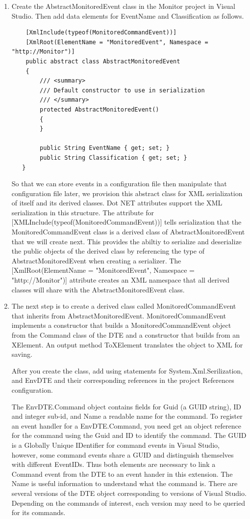 \begin{enumerate}
\item
Create the AbstractMonitoredEvent class in the Monitor project in Visual Studio.  Then add data elements for EventName and Classification as follows.

\begin{lstlisting}
    [XmlInclude(typeof(MonitoredCommandEvent))]
    [XmlRoot(ElementName = "MonitoredEvent", Namespace = "http://Monitor")]
    public abstract class AbstractMonitoredEvent
    {
        /// <summary>
        /// Default constructor to use in serialization
        /// </summary>
        protected AbstractMonitoredEvent()
        {
        }

        public String EventName { get; set; }
        public String Classification { get; set; }
   }
\end{lstlisting}

So that we can store events in a configuration file then manipulate that configuration file later, we provision this abstract class for XML serialization of itself and its derived classes.  Dot NET attributes support the XML serialization in this structure.  The attribute for [XMLInclude(typeof(MonitoredCommandEvent))] tells serialization that the MonitoredCommandEvent class is a derived class of AbstractMonitoredEvent that we will create next.  This provides the abiltiy to serialize and deserialize the public objects of the derived class by referencing the type of AbstractMonitoredEvent when creating a serializer.  The [XmlRoot(ElementName = "MonitoredEvent", Namespace = "http://Monitor")] attribute creates an XML namespace that all derived classes will share with the AbstractMonitoredEvent class.

\item
The next step is to create a derived class called MonitoredCommandEvent that inherits from AbstractMonitoredEvent.  MonitoredCommandEvent implements a constructor that builds a MonitoredCommandEvent object from the Command class of the DTE and a constructor that builds from an XElement.  An output method ToXElement translates the object to XML for saving.

After you create the class, add using statements for System.Xml.Serilization, and EnvDTE and their corresponding references in the project References configuration. 

The EnvDTE.Command object contains fields for Guid (a GUID string), ID and integer sub-id, and Name a readable name for the command.  To register an event handler for a EnvDTE.Command, you need get an object reference for the command using the Guid and ID to identify the command.  The GUID is  a Globally Unique IDentifier for command events in Visual Studio, however, some command events share a GUID and distinguish themselves with different EventIDs. Thus both elements are necessary to link a Command event from the DTE to an event hander in this extension.  The Name is useful information to understand what the command is.    There are several versions of the DTE object corresponding to versions of Visual Studio.  Depending on the commands of interest, each version may need to be queried for its commands.  


\end{enumerate}
